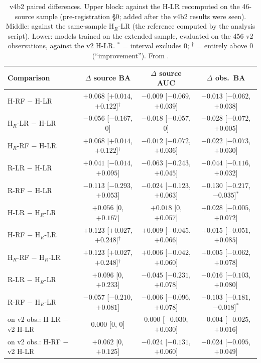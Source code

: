 \begin{table}[htbp]
\centering\small
\caption[v4b2 paired differences]{v4b2 paired differences. Upper block: against the H-LR recomputed on the 46-source
sample (pre-registration \S0; added after the v4b2 results were seen). Middle: against the same-sample H$_R$-LR (the
reference computed by the analysis script). Lower: models trained on the extended sample, evaluated on the 456 v2
observations, against the v2 H-LR. $^*$ = interval excludes 0; $^\dagger$ = entirely above 0 (``improvement'').
From .}
\label{tab:p2v4b2diff}
\footnotesize\setlength{\tabcolsep}{3.5pt}
\begin{tabular}{@{}lccc@{}}
\toprule
Comparison & $\Delta$ source BA & $\Delta$ source AUC & $\Delta$ obs.\ BA \\
\midrule
H-RF $-$ H-LR & $+0.068$ [$+0.014$, $+0.122$]$^\dagger$ & $-0.009$ [$-0.069$, $+0.039$] & $-0.013$ [$-0.062$, $+0.038$] \\
H$_R$-LR $-$ H-LR & $-0.056$ [$-0.167$, 0] & $-0.018$ [$-0.057$, 0] & $-0.028$ [$-0.072$, $+0.005$] \\
H$_R$-RF $-$ H-LR & $+0.068$ [$+0.014$, $+0.122$]$^\dagger$ & $-0.012$ [$-0.072$, $+0.036$] & $-0.022$ [$-0.073$, $+0.030$] \\
R-LR $-$ H-LR & $+0.041$ [$-0.014$, $+0.095$] & $-0.063$ [$-0.243$, $+0.045$] & $-0.044$ [$-0.116$, $+0.032$] \\
R-RF $-$ H-LR & $-0.113$ [$-0.293$, $+0.053$] & $-0.024$ [$-0.123$, $+0.063$] & $-0.130$ [$-0.217$, $-0.035$]$^*$ \\
\midrule
H-LR $-$ H$_R$-LR & $+0.056$ [0, $+0.167$] & $+0.018$ [0, $+0.057$] & $+0.028$ [$-0.005$, $+0.072$] \\
H-RF $-$ H$_R$-LR & $+0.123$ [$+0.027$, $+0.248$]$^\dagger$ & $+0.009$ [$-0.045$, $+0.066$] & $+0.015$ [$-0.051$, $+0.085$] \\
H$_R$-RF $-$ H$_R$-LR & $+0.123$ [$+0.027$, $+0.248$]$^\dagger$ & $+0.006$ [$-0.042$, $+0.060$] & $+0.005$ [$-0.062$, $+0.078$] \\
R-LR $-$ H$_R$-LR & $+0.096$ [0, $+0.233$] & $-0.045$ [$-0.231$, $+0.078$] & $-0.016$ [$-0.103$, $+0.080$] \\
R-RF $-$ H$_R$-LR & $-0.057$ [$-0.210$, $+0.081$] & $-0.006$ [$-0.096$, $+0.078$] & $-0.103$ [$-0.181$, $-0.018$]$^*$ \\
\midrule
on v2 obs.: H-LR $-$ v2 H-LR & $0.000$ [0, 0] & $0.000$ [$-0.030$, $+0.030$] & $-0.004$ [$-0.025$, $+0.016$] \\
on v2 obs.: H-RF $-$ v2 H-LR & $+0.062$ [0, $+0.125$] & $-0.024$ [$-0.131$, $+0.060$] & $-0.024$ [$-0.095$, $+0.049$] \\

\end{tabular}
\end{table}
